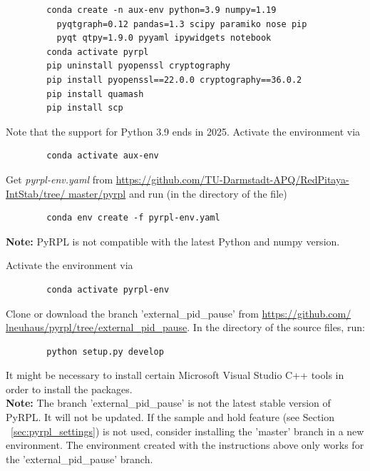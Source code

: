 \documentclass[twoside,a4paper]{refart}
\begin{document}
\begin{tcolorbox}
	\begin{verbatim}
		conda create -n aux-env python=3.9 numpy=1.19
		  pyqtgraph=0.12 pandas=1.3 scipy paramiko nose pip 
		  pyqt qtpy=1.9.0 pyyaml ipywidgets notebook
		conda activate pyrpl
		pip uninstall pyopenssl cryptography
		pip install pyopenssl==22.0.0 cryptography==36.0.2
		pip install quamash
		pip install scp
	\end{verbatim}
\end{tcolorbox}

Note that the support for Python 3.9 ends in 2025. Activate the environment via

\begin{tcolorbox}
	\begin{verbatim}
		conda activate aux-env
	\end{verbatim}
\end{tcolorbox}

Get \textit{pyrpl-env.yaml} from \href{https://github.com/TU-Darmstadt-APQ/RedPitaya-IntStab/tree/master/pyrpl}{https://github.com/TU-Darmstadt-APQ/RedPitaya-IntStab/tree/ master/pyrpl} and run (in the directory of the file) 

\begin{tcolorbox}
	\begin{verbatim}
		conda env create -f pyrpl-env.yaml
	\end{verbatim}
\end{tcolorbox}

\textbf{Note:}  PyRPL is not compatible with the latest Python and numpy version.


Activate the environment via 
\begin{tcolorbox}
	\begin{verbatim}
		conda activate pyrpl-env
	\end{verbatim}
\end{tcolorbox}
Clone or download the branch 'external\_pid\_pause' from \href{https://github.com/lneuhaus/pyrpl/tree/external_pid_pause}{https://github.com/ lneuhaus/pyrpl/tree/external\_pid\_pause}. In the directory of the source files, run:

\begin{tcolorbox}
	\begin{verbatim}
		python setup.py develop
	\end{verbatim}
\end{tcolorbox}

It might be necessary to install certain Microsoft Visual Studio C++ tools in order to install the packages. \\
\textbf{Note:} The branch 'external\_pid\_pause' is not the latest stable version of PyRPL. It will not be updated. If the sample and hold feature (see Section ~\ref{sec:pyrpl_settings})  is not used, consider installing the 'master' branch in a new environment. The environment created with the instructions above only works for the  'external\_pid\_pause' branch. 
\end{document}

